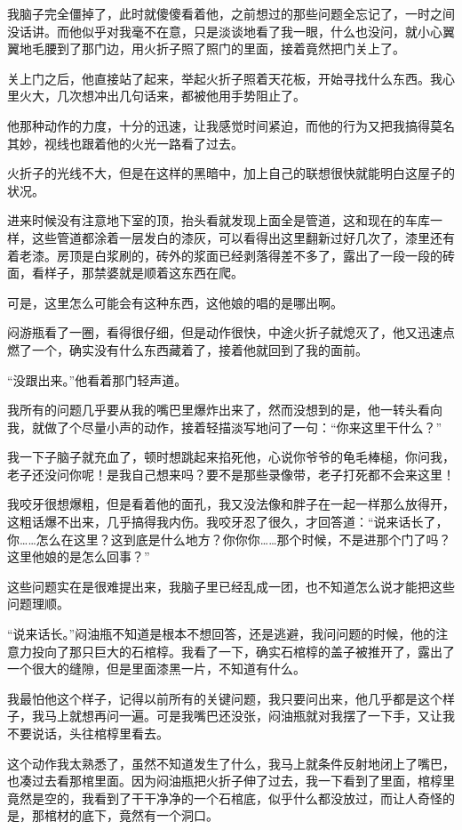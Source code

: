 我脑子完全僵掉了，此时就傻傻看着他，之前想过的那些问题全忘记了，一时之间没话讲。而他似乎对我毫不在意，只是淡谈地看了我一眼，什么也没问，就小心翼翼地毛腰到了那门边，用火折子照了照门的里面，接着竟然把门关上了。

关上门之后，他直接站了起来，举起火折子照着天花板，开始寻找什么东西。我心里火大，几次想冲出几句话来，都被他用手势阻止了。

他那种动作的力度，十分的迅速，让我感觉时间紧迫，而他的行为又把我搞得莫名其妙，视线也跟着他的火光一路看了过去。

火折子的光线不大，但是在这样的黑暗中，加上自己的联想很快就能明白这屋子的状况。

进来时候没有注意地下室的顶，抬头看就发现上面全是管道，这和现在的车库一样，这些管道都涂着一层发白的漆灰，可以看得出这里翻新过好几次了，漆里还有着老漆。房顶是白浆刷的，砖外的浆面已经剥落得差不多了，露出了一段一段的砖面，看样子，那禁婆就是顺着这东西在爬。

可是，这里怎么可能会有这种东西，这他娘的唱的是哪出啊。

闷游瓶看了一圈，看得很仔细，但是动作很快，中途火折子就熄灭了，他又迅速点燃了一个，确实没有什么东西藏着了，接着他就回到了我的面前。

“没跟出来。”他看着那门轻声道。

我所有的问题几乎要从我的嘴巴里爆炸出来了，然而没想到的是，他一转头看向我，就做了个尽量小声的动作，接着轻描淡写地问了一句：“你来这里干什么？”

我一下子脑子就充血了，顿时想跳起来掐死他，心说你爷爷的龟毛棒槌，你问我，老子还没问你呢！是我自己想来吗？要不是那些录像带，老子打死都不会来这里！

我咬牙很想爆粗，但是看着他的面孔，我又没法像和胖子在一起一样那么放得开，这粗话爆不出来，几乎搞得我内伤。我咬牙忍了很久，才回答道：“说来话长了，你……怎么在这里？这到底是什么地方？你你你……那个时候，不是进那个门了吗？这里他娘的是怎么回事？”

这些问题实在是很难提出来，我脑子里已经乱成一团，也不知道怎么说才能把这些问题理顺。

“说来话长。”闷油瓶不知道是根本不想回答，还是逃避，我问问题的时候，他的注意力投向了那只巨大的石棺椁。我看了一下，确实石棺椁的盖子被推开了，露出了一个很大的缝隙，但是里面漆黑一片，不知道有什么。

我最怕他这个样子，记得以前所有的关键问题，我只要问出来，他几乎都是这个样子，我马上就想再问一遍。可是我嘴巴还没张，闷油瓶就对我摆了一下手，又让我不要说话，头往棺椁里看去。

这个动作我太熟悉了，虽然不知道发生了什么，我马上就条件反射地闭上了嘴巴，也凑过去看那棺里面。因为闷油瓶把火折子伸了过去，我一下看到了里面，棺椁里竟然是空的，我看到了干干净净的一个石棺底，似乎什么都没放过，而让人奇怪的是，那棺材的底下，竟然有一个洞口。

